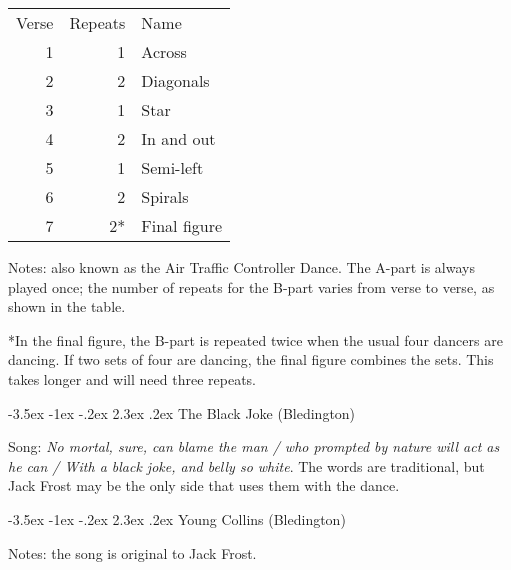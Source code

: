 \documentclass[12pt,a4paper]{article}
\makeatletter
\renewcommand\section{\@startsection {section}{1}{\z@}%
                                   {-3.5ex \@plus -1ex \@minus -.2ex}%
                                   {2.3ex \@plus.2ex}%
                                   {\normalfont\Large}}
\makeatother
\begin{document}

\begin{minipage}[t]{6cm}
\vspace{0pt}
\begin{tabular}{rrl}
Verse & Repeats & Name \\
1 & 1 & Across \\
2 & 2 & Diagonals \\
3 & 1 & Star \\
4 & 2 & In and out \\
5 & 1 & Semi-left \\
6 & 2 & Spirals \\
7 & 2* & Final figure
\end{tabular}
\end{minipage} \hspace{3mm} \begin{minipage}[t]{10cm}
\vspace{0pt}
\noindent Notes: also known as the Air Traffic Controller Dance.
The A-part is always played once; the number of repeats for the
B-part varies from verse to verse, as shown in the table.

\smallskip

*In the final figure, the B-part is repeated twice when the usual four
dancers are dancing.  If two sets of four are dancing, the final
figure combines the sets. This takes longer and will need three
repeats.
\end{minipage}
\pagebreak[1]

\section{The Black Joke (Bledington)}


\noindent Song: \textit{No mortal, sure, can blame the man / who
  prompted by nature will act as he can / With a black joke, and belly
  so white}. The words are traditional, but Jack Frost may be the only
side that uses them with the dance.

\pagebreak[1]

\section{Young Collins (Bledington)}


\noindent Notes: the song is original to Jack Frost.
\end{document}
